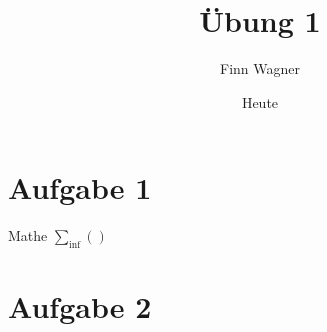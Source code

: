 \documentclass{article}
\title{Übung 1}
\author{Finn Wagner}
\date{Heute}
\begin{document}
\maketitle

\section{Aufgabe 1}
Mathe 
$\sum_{\inf} ()$
\section{Aufgabe 2}
\end{document}
